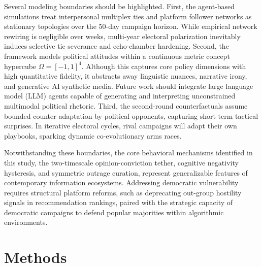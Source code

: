 \documentclass[11pt,a4paper]{article}
\begin{document}
Several modeling boundaries should be highlighted. First, the agent-based simulations treat interpersonal multiplex ties and platform follower networks as stationary topologies over the 50-day campaign horizon. While empirical network rewiring is negligible over weeks, multi-year electoral polarization inevitably induces selective tie severance and echo-chamber hardening. Second, the framework models political attitudes within a continuous metric concept hypercube $\Omega = [-1, 1]^4$. Although this captures core policy dimensions with high quantitative fidelity, it abstracts away linguistic nuances, narrative irony, and generative AI synthetic media. Future work should integrate large language model (LLM) agents capable of generating and interpreting unconstrained multimodal political rhetoric. Third, the second-round counterfactuals assume bounded counter-adaptation by political opponents, capturing short-term tactical surprises. In iterative electoral cycles, rival campaigns will adapt their own playbooks, sparking dynamic co-evolutionary arms races.

Notwithstanding these boundaries, the core behavioral mechanisms identified in this study, the two-timescale opinion-conviction tether, cognitive negativity hysteresis, and symmetric outrage curation, represent generalizable features of contemporary information ecosystems. Addressing democratic vulnerability requires structural platform reforms, such as deprecating out-group hostility signals in recommendation rankings, paired with the strategic capacity of democratic campaigns to defend popular majorities within algorithmic environments.

\section*{Methods}
\label{sec:methods}
\end{document}

